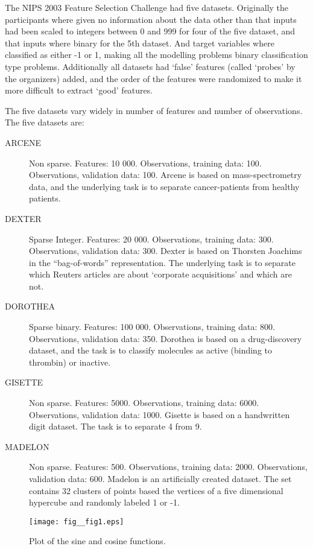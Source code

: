 \documentclass[12pt]{article}
\begin{document}
The NIPS 2003 Feature Selection Challenge had five datasets. Originally the participants where given no information about the data other than that inputs had been scaled to integers between 0 and 999 for four of the five dataset, and that inputs where binary for the 5th dataset. And target variables where classified as either -1 or 1, making all the modelling problems binary classification type problems. Additionally all datasets had `false' features (called `probes' by the organizers) added, and the order of the features were randomized to make it more difficult to extract `good' features.

The five datasets vary widely in number of features and number of observations. The five datasets are:
\begin{description}
\item [ARCENE] Non sparse. Features: 10 000. Observations, training data: 100. Observations, validation data: 100. Arcene is based on mass-spectrometry data, and the underlying task is to separate cancer-patients from healthy patients. 
\item [DEXTER] Sparse Integer. Features: 20 000. Observations, training data: 300. Observations, validation data: 300. Dexter is based on Thorsten Joachims in the “bag-of-words” representation. The underlying task is to separate which Reuters articles are about `corporate acquisitions' and which are not.
\item[DOROTHEA] Sparse binary. Features: 100 000.  Observations, training data: 800.  Observations, validation data: 350. Dorothea is based on a drug-discovery dataset, and the task is to classify molecules as active (binding to thrombin) or inactive.
\item[GISETTE] Non sparse. Features: 5000. Observations, training data: 6000. Observations, validation data: 1000. Gisette is based on a handwritten digit dataset. The task is to separate 4 from 9.
\item[MADELON] Non sparse. Features: 500. Observations, training data: 2000. Observations, validation data: 600. Madelon is an artificially created dataset. The set contains 32 clusters of points based the vertices of a five dimensional hypercube and randomly labeled 1 or -1.
\end{description}

\begin{figure}[t]
  \begin{center}
    \texttt{[image: fig\_\_fig1.eps]}
    \caption{\label{fig:sin_cos} Plot of the sine and cosine functions.}
  \end{center}
\end{figure}
\end{document}
